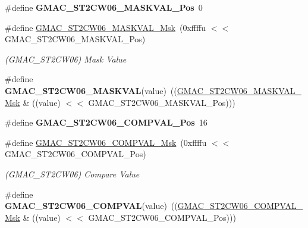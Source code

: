 \begin{DoxyCompactItemize}
\#define {\bfseries G\+M\+A\+C\+\_\+\+S\+T2\+C\+W06\+\_\+\+M\+A\+S\+K\+V\+A\+L\+\_\+\+Pos}~0
\item 
\mbox{\label{group__SAME70__GMAC_gab9551388c104d77140ec7670de967181}} 
\#define \mbox{\hyperlink{group__SAME70__GMAC_gab9551388c104d77140ec7670de967181}{G\+M\+A\+C\+\_\+\+S\+T2\+C\+W06\+\_\+\+M\+A\+S\+K\+V\+A\+L\+\_\+\+Msk}}~(0xffffu $<$$<$ G\+M\+A\+C\+\_\+\+S\+T2\+C\+W06\+\_\+\+M\+A\+S\+K\+V\+A\+L\+\_\+\+Pos)
\begin{DoxyCompactList}\small\item\em (G\+M\+A\+C\+\_\+\+S\+T2\+C\+W06) Mask Value \end{DoxyCompactList}\item 
\mbox{\label{group__SAME70__GMAC_gafe28d31773ba597b687dc6c5b5a4c036}} 
\#define {\bfseries G\+M\+A\+C\+\_\+\+S\+T2\+C\+W06\+\_\+\+M\+A\+S\+K\+V\+AL}(value)~((\mbox{\hyperlink{group__SAMV71__GMAC_gab9551388c104d77140ec7670de967181}{G\+M\+A\+C\+\_\+\+S\+T2\+C\+W06\+\_\+\+M\+A\+S\+K\+V\+A\+L\+\_\+\+Msk}} \& ((value) $<$$<$ G\+M\+A\+C\+\_\+\+S\+T2\+C\+W06\+\_\+\+M\+A\+S\+K\+V\+A\+L\+\_\+\+Pos)))
\item 
\mbox{\label{group__SAME70__GMAC_gae37aa2072d6d05e07714e3b4799b5529}} 
\#define {\bfseries G\+M\+A\+C\+\_\+\+S\+T2\+C\+W06\+\_\+\+C\+O\+M\+P\+V\+A\+L\+\_\+\+Pos}~16
\item 
\mbox{\label{group__SAME70__GMAC_ga258850fddaf8cab9ebde0a4212f28811}} 
\#define \mbox{\hyperlink{group__SAME70__GMAC_ga258850fddaf8cab9ebde0a4212f28811}{G\+M\+A\+C\+\_\+\+S\+T2\+C\+W06\+\_\+\+C\+O\+M\+P\+V\+A\+L\+\_\+\+Msk}}~(0xffffu $<$$<$ G\+M\+A\+C\+\_\+\+S\+T2\+C\+W06\+\_\+\+C\+O\+M\+P\+V\+A\+L\+\_\+\+Pos)
\begin{DoxyCompactList}\small\item\em (G\+M\+A\+C\+\_\+\+S\+T2\+C\+W06) Compare Value \end{DoxyCompactList}\item 
\mbox{\label{group__SAME70__GMAC_ga0f2009166404e3e114401d2dcf7fe086}} 
\#define {\bfseries G\+M\+A\+C\+\_\+\+S\+T2\+C\+W06\+\_\+\+C\+O\+M\+P\+V\+AL}(value)~((\mbox{\hyperlink{group__SAMV71__GMAC_ga258850fddaf8cab9ebde0a4212f28811}{G\+M\+A\+C\+\_\+\+S\+T2\+C\+W06\+\_\+\+C\+O\+M\+P\+V\+A\+L\+\_\+\+Msk}} \& ((value) $<$$<$ G\+M\+A\+C\+\_\+\+S\+T2\+C\+W06\+\_\+\+C\+O\+M\+P\+V\+A\+L\+\_\+\+Pos)))

\end{DoxyCompactItemize}
